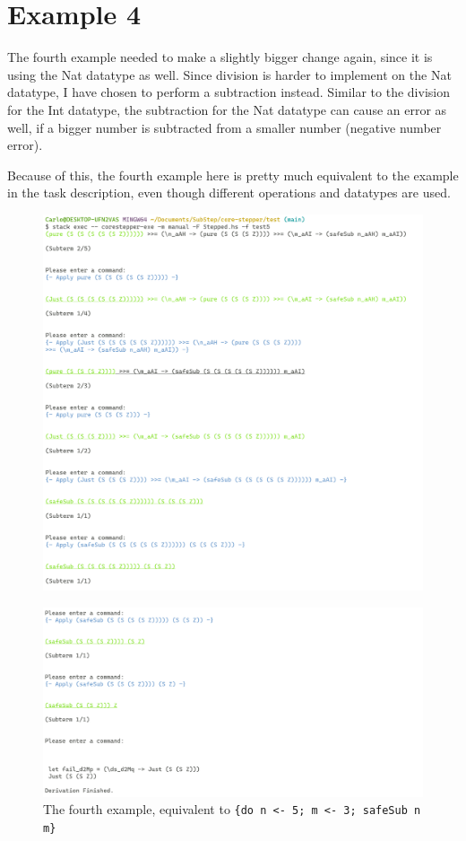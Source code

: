\clearpage
\section{Example 4}
The fourth example needed to make a slightly bigger change again,
since it is using the Nat datatype as well.
Since division is harder to implement on the Nat datatype,
I have chosen to perform a subtraction instead.
Similar to the division for the Int datatype,
the subtraction for the Nat datatype can cause an error as well,
if a bigger number is subtracted from a smaller number (negative number error).

Because of this,
the fourth example here is pretty much equivalent to the example in the task description,
even though different operations and datatypes are used.

\begin{figure}
    \includegraphics[width=1\textwidth]{resources/bind_part_1.PNG}
\end{figure}
\begin{figure}
    \includegraphics[width=1\textwidth]{resources/bind_part_2.PNG}
    \caption{The fourth example, equivalent to \texttt{\{do n <- 5; m <- 3; safeSub n m\}}}
\end{figure}
